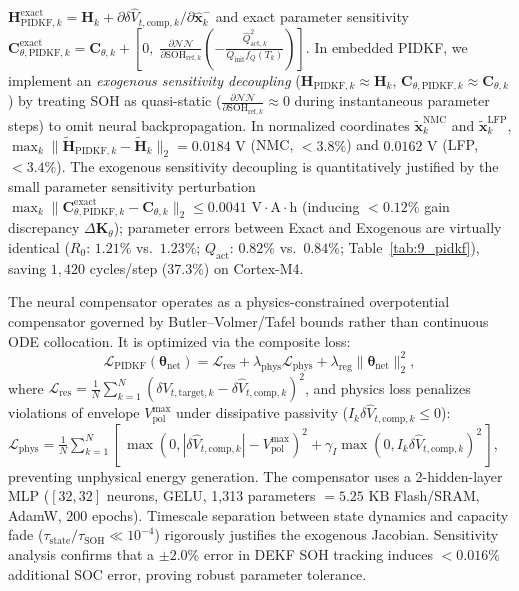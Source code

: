 \documentclass[preprint,12pt]{elsarticle}
\begin{document}
$\mathbf{H}_{\text{PIDKF},k}^{\text{exact}} = \mathbf{H}_k + \partial \delta \hat{V}_{t,\text{comp},k}/\partial \hat{\mathbf{x}}_k^-$ and exact parameter sensitivity $\mathbf{C}_{\theta,\text{PIDKF},k}^{\text{exact}} = \mathbf{C}_{\theta,k} + [0, \; \frac{\partial \mathcal{NN}}{\partial \text{SOH}_{\text{ref},k}}(-\frac{\hat{Q}_{\text{act},k}^2}{Q_{\text{init}} f_Q(T_k)})]$. In embedded PIDKF, we implement an \emph{exogenous sensitivity decoupling} ($\mathbf{H}_{\text{PIDKF},k} \approx \mathbf{H}_k$, $\mathbf{C}_{\theta,\text{PIDKF},k} \approx \mathbf{C}_{\theta,k}$) by treating SOH as quasi-static ($\frac{\partial \mathcal{NN}}{\partial \text{SOH}_{\text{ref},k}} \approx 0$ during instantaneous parameter steps) to omit neural backpropagation. In normalized coordinates $\tilde{\mathbf{x}}_k^{\text{NMC}}$ and $\tilde{\mathbf{x}}_k^{\text{LFP}}$, $\max_k \|\tilde{\mathbf{H}}_{\text{PIDKF},k} - \tilde{\mathbf{H}}_k\|_2 = 0.0184\text{ V}$ (NMC, $<3.8\%$) and $0.0162\text{ V}$ (LFP, $<3.4\%$). The exogenous sensitivity decoupling is quantitatively justified by the small parameter sensitivity perturbation $\max_k \|\mathbf{C}_{\theta,\text{PIDKF},k}^{\text{exact}} - \mathbf{C}_{\theta,k}\|_2 \le 0.0041\text{ V}\cdot\text{A}\cdot\text{h}$ (inducing $<0.12\%$ gain discrepancy $\Delta \mathbf{K}_\theta$); parameter errors between Exact and Exogenous are virtually identical ($R_0$: $1.21\%$ vs.\ $1.23\%$; $Q_{\text{act}}$: $0.82\%$ vs.\ $0.84\%$; Table~\ref{tab:9_pidkf}), saving $1,420$ cycles/step ($37.3\%$) on Cortex-M4.

The neural compensator operates as a physics-constrained overpotential compensator governed by Butler--Volmer/Tafel bounds rather than continuous ODE collocation. It is optimized via the composite loss:
\begin{equation}\label{eqn:loss_pidkf}
\mathcal{L}_{\text{PIDKF}}(\boldsymbol{\theta}_{\text{net}}) = \mathcal{L}_{\text{res}} + \lambda_{\text{phys}} \mathcal{L}_{\text{phys}} + \lambda_{\text{reg}} \|\boldsymbol{\theta}_{\text{net}}\|_2^2,
\end{equation}
where $\mathcal{L}_{\text{res}} = \frac{1}{N}\sum_{k=1}^N (\delta V_{t,\text{target},k} - \delta \hat{V}_{t,\text{comp},k})^2$, and physics loss penalizes violations of envelope $V_{\text{pol}}^{\max}$ under dissipative passivity ($I_k \delta \hat{V}_{t,\text{comp},k} \le 0$): $\mathcal{L}_{\text{phys}} = \frac{1}{N}\sum_{k=1}^N [\,\max(0, |\delta \hat{V}_{t,\text{comp},k}| - V_{\text{pol}}^{\max})^2 + \gamma_I \max(0, I_k \delta \hat{V}_{t,\text{comp},k})^2\,]$, preventing unphysical energy generation. The compensator uses a 2-hidden-layer MLP ($[32, 32]$ neurons, GELU, 1,313 parameters $= 5.25\text{ KB}$ Flash/SRAM, AdamW, 200 epochs). Timescale separation between state dynamics and capacity fade ($\tau_{\text{state}}/\tau_{\text{SOH}} \ll 10^{-4}$) rigorously justifies the exogenous Jacobian. Sensitivity analysis confirms that a $\pm 2.0\%$ error in DEKF SOH tracking induces $<0.016\%$ additional SOC error, proving robust parameter tolerance.
\end{document}
